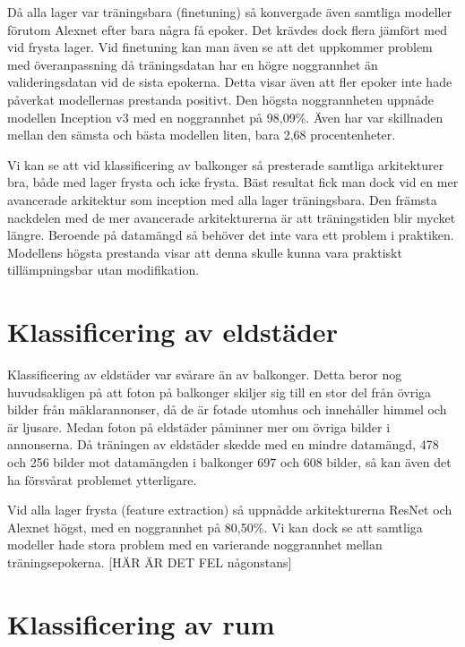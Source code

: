 \documentclass[]{kththesis}
\begin{document}
Då alla lager var träningsbara (finetuning) så konvergade även samtliga modeller förutom Alexnet efter bara några få epoker. Det krävdes dock flera jämfört med vid frysta lager. Vid finetuning kan man även se att det uppkommer problem med överanpassning då träningsdatan har en högre noggrannhet än valideringsdatan vid de sista epokerna. Detta visar även att fler epoker inte hade påverkat modellernas prestanda positivt. Den högsta noggrannheten uppnåde modellen Inception v3 med en noggrannhet på 98,09\%. Även har var skillnaden mellan den sämsta och bästa modellen liten, bara 2,68 procentenheter.

Vi kan se att vid klassificering av balkonger så presterade samtliga arkitekturer bra, både med lager frysta och icke frysta. Bäst resultat fick man dock vid en mer avancerade arkitektur som inception med alla lager träningsbara. Den främsta nackdelen med de mer avancerade arkitekturerna är att träningstiden blir mycket längre. Beroende på datamängd så behöver det inte vara ett problem i praktiken. Modellens högsta prestanda visar att denna skulle kunna vara praktiskt tillämpningsbar utan modifikation.

\section{Klassificering av eldstäder}


Klassificering av eldstäder var svårare än av balkonger. Detta beror nog huvudsakligen på att foton på balkonger skiljer sig till en stor del från övriga bilder från mäklarannonser, då de är fotade utomhus och innehåller himmel och är ljusare. Medan foton på eldstäder påminner mer om övriga bilder i annonserna. Då träningen av eldstäder skedde med en mindre datamängd, 478 och 256 bilder mot datamängden i balkonger 697 och 608 bilder, så kan även det ha försvårat problemet ytterligare. 

Vid alla lager frysta (feature extraction) så uppnådde arkitekturerna ResNet och Alexnet högst, med en noggrannhet på 80,50\%. Vi kan dock se att samtliga modeller hade stora problem med en varierande noggrannhet mellan träningsepokerna. [HÄR ÄR DET FEL någonstans]

\section{Klassificering av rum}
\end{document}
